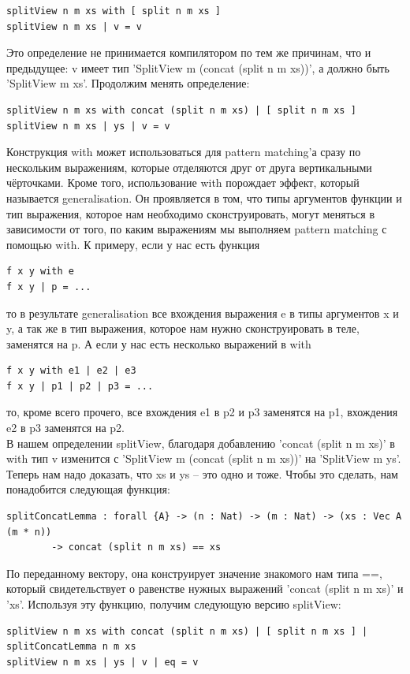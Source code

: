 \documentclass[8pt]{extarticle}
\begin{document}
\begin{lstlisting}
splitView n m xs with [ split n m xs ]
splitView n m xs | v = v
\end{lstlisting}
Это определение не принимается компилятором по тем же причинам, что и предыдущее: v имеет тип 'SplitView m (concat (split n m xs))', а должно быть 'SplitView m xs'. Продолжим менять определение:
\begin{lstlisting}
splitView n m xs with concat (split n m xs) | [ split n m xs ]
splitView n m xs | ys | v = v
\end{lstlisting}
Конструкция with может использоваться для pattern matching'а сразу по нескольким выражениям, которые отделяются друг от друга вертикальными чёрточками. Кроме того, использование with порождает эффект, который называется generalisation. Он проявляется в том, что типы аргументов функции и тип выражения, которое нам необходимо сконструировать, могут меняться в зависимости от того, по каким выражениям мы выполняем pattern matching с помощью with. К примеру, если у нас есть функция
\begin{lstlisting}
f x y with e
f x y | p = ...
\end{lstlisting}
то в результате generalisation все вхождения выражения e в типы аргументов x и y, а так же в тип выражения, которое нам нужно сконструировать в теле, заменятся на p. А если у нас есть несколько выражений в with
\begin{lstlisting}
f x y with e1 | e2 | e3
f x y | p1 | p2 | p3 = ...
\end{lstlisting}
то, кроме всего прочего, все вхождения e1 в p2 и p3 заменятся на p1, вхождения e2 в p3 заменятся на p2.\\
В нашем определении splitView, благодаря добавлению 'concat (split n m xs)' в with тип v изменится с 'SplitView m (concat (split n m xs))' на 'SplitView m ys'. Теперь нам надо доказать, что xs и ys -- это одно и тоже. Чтобы это сделать, нам понадобится следующая функция:
\begin{lstlisting}
splitConcatLemma : forall {A} -> (n : Nat) -> (m : Nat) -> (xs : Vec A (m * n)) 
		-> concat (split n m xs) == xs
\end{lstlisting}
По переданному вектору, она конструирует значение знакомого нам типа ==, который свидетельствует о равенстве нужных выражений 'concat (split n m xs)' и 'xs'. Используя эту функцию, получим следующую версию splitView:
\begin{lstlisting}
splitView n m xs with concat (split n m xs) | [ split n m xs ] | splitConcatLemma n m xs
splitView n m xs | ys | v | eq = v
\end{lstlisting}
\end{document}
